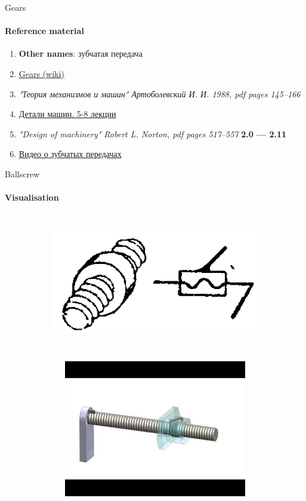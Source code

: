\documentclass[aspectratio=169]{beamer}
\begin{document}
\begin{frame}[t]{Gears}
    \framesubtitle{Reference material}
    \begin{enumerate}
        \item \textbf{Other names}: зубчатая передача
        \item \href{https://en.wikipedia.org/wiki/Gear}{Gears (wiki)}
        \item \textit{"Теория механизмов и машин" Артоболевский И. И. 1988, pdf pages 145--166 }
        \item \href{https://studfile.net/preview/2156468/}{Детали машин. 5-8 лекции}
        \item \textit{"Design of machinery" Robert L. Norton, pdf pages 517--557 } \textbf{2.0 --- 2.11}
        \item \href{https://youtu.be/ThVIKgBucUk}{Видео о зубчатых передачах}
    \end{enumerate}
\end{frame}

\begin{frame}[t]{Ballscrew}
    \framesubtitle{Visualisation}
    \vspace{-0.5cm}
    \begin{figure}[H]
        \begin{subfigure}{0.49\textwidth}
            \centering\includegraphics[height=6cm,width=1\textwidth,keepaspectratio]{H_sd.png}
        \end{subfigure}
        \begin{subfigure}{0.49\textwidth}
            \href{https://www.youtube.com/watch?v=oEPrXljqeHA}{
                \centering\includegraphics[height=6cm,width=1\textwidth,keepaspectratio]{ballscrew_preview.jpg}}
        \end{subfigure}
    \end{figure} 
\end{frame}
\end{document}
